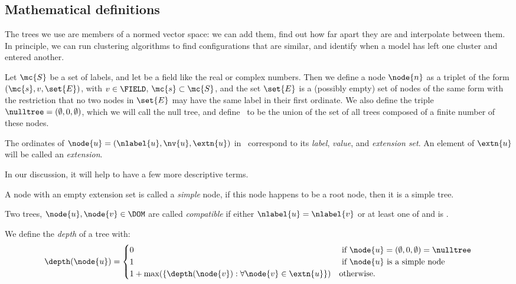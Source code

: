 \onecolumn

\section{\appendixname}
\subsection{Mathematical definitions}\label{AppTrees}
The trees we use are members of a normed vector space: we can add
them, find out how far apart they are and interpolate between them. In
principle, we can run clustering algorithms to find con\-fig\-ur\-a\-tions
that are similar, and identify when a model has left one cluster and
entered another.


\begin{definition}\label{defdomain}
  Let $\mc{S}$ be a set of labels, and let \TFIELD be a field like
  the real or complex numbers. Then we define a node $\node{n}$ as a
  triplet of the form $(\mc{s}, v, \set{E})$, with $v \in \FIELD$,
  $\mc{s} \subset \mc{S}$, and the set $\set{E}$ is a (possibly empty)
  set of nodes of the same form with the restriction that no two nodes
  in $\set{E}$ may have the same label in their first ordinate.  We
  also define the triple $\nulltree = (\emptyset, 0, \emptyset)$,
  which we will call the null tree, and define \TDOM\ to be the union
  of the set of all trees composed of a finite number of these nodes.

  The ordinates of $\node{u} = (\nlabel{u}, \nv{u}, \extn{u})$ in
  \TDOM\ correspond to its \emph{label}, \emph{value}, and
  \emph{extension set}.  An element of $\extn{u}$ will be called an
  \emph{extension}.
\end{definition}


In our discussion, it will help to have a few more descriptive terms.

A node with an empty extension set is called a \emph{simple}
node, if this node happens to be a root node, then it is a simple tree.

Two trees, $\node{u}, \node{v} \in \DOM$ are called
  \emph{compatible} if either $\nlabel{u} = \nlabel{v}$ or at least
  one of  and  is \tnulltree.

We define the \emph{depth} of a tree with:
  \begin{align*}
    \depth(\node{u}) = \begin{cases}
      0 & \text{ if } \node{u} = (\emptyset,0,\emptyset) = \nulltree \\
      1 & \text{ if } \node{u} \text{ is a simple node} \\
      1 + \max(\lbrace\depth(\node{v}):\forall \node{v} \in \extn{u}\rbrace) & \text{otherwise.}
    \end{cases}
  \end{align*}

